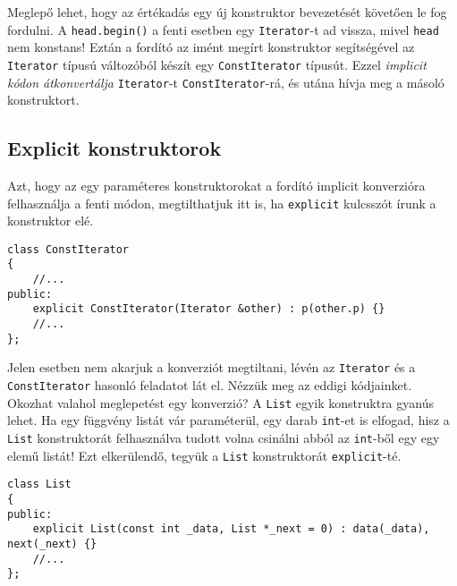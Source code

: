 \documentclass[a4paper,11.5pt,table]{article}
\begin{document}
	Meglepő lehet, hogy az értékadás egy új konstruktor bevezetését követően le fog fordulni. A \texttt{head.begin()} a fenti esetben egy \texttt{Iterator}-t ad vissza, mivel \texttt{head} nem konstans! Eztán a fordító az imént megírt konstruktor segítségével az \texttt{Iterator} típusú változóból készít egy \texttt{ConstIterator} típusút. Ezzel \textit{implicit kódon átkonvertálja} \texttt{Iterator}-t \texttt{ConstIterator}-rá, és utána hívja meg a másoló konstruktort. 
	
	\subsection{Explicit konstruktorok}
	Azt, hogy az egy paraméteres konstruktorokat a fordító implicit konverzióra felhasználja a fenti módon, megtilthatjuk itt is, ha \texttt{explicit} kulcsszót írunk a konstruktor elé.
	
	\begin{lstlisting}
class ConstIterator
{
	//...
public:
	explicit ConstIterator(Iterator &other) : p(other.p) {}
	//...
};
	\end{lstlisting}
	Jelen esetben nem akarjuk a konverziót megtiltani, lévén az \texttt{Iterator} és a \texttt{ConstIterator} hasonló feladatot lát el. Nézzük meg az eddigi kódjainket. Okozhat valahol meglepetést egy konverzió? A \texttt{List} egyik konstruktra gyanús lehet. Ha egy függvény listát vár paraméterül, egy darab \texttt{int}-et is elfogad, hisz a \texttt{List} konstruktorát felhasználva tudott volna csinálni abból az \texttt{int}-ből egy egy elemű listát! Ezt elkerülendő, tegyük a \texttt{List} konstruktorát \texttt{explicit}-té.
	\begin{lstlisting}
class List
{
public:
	explicit List(const int _data, List *_next = 0) : data(_data), next(_next) {}
	//...
};
	\end{lstlisting}
\end{document}
